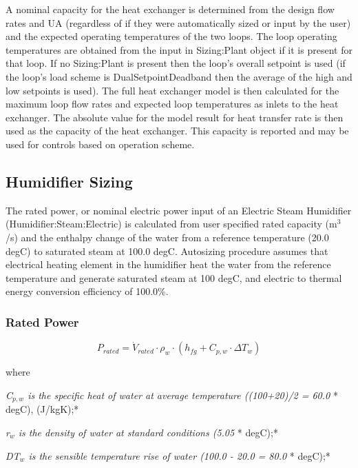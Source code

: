 A nominal capacity for the heat exchanger is determined from the design flow rates and UA (regardless of if they were automatically sized or input by the user) and the expected operating temperatures of the two loops. The loop operating temperatures are obtained from the input in Sizing:Plant object if it is present for that loop. If no Sizing:Plant is present then the loop's overall setpoint is used (if the loop's load scheme is DualSetpointDeadband then the average of the high and low setpoints is used). The full heat exchanger model is then calculated for the maximum loop flow rates and expected loop temperatures as inlets to the heat exchanger. The absolute value for the model result for heat transfer rate is then used as the capacity of the heat exchanger. This capacity is reported and may be used for controls based on operation scheme.

\subsection{Humidifier Sizing}\label{humidifier-sizing}

The rated power, or nominal electric power input of an Electric Steam Humidifier (Humidifier:Steam:Electric) is calculated from user specified rated capacity (m\(^{3}\)/s) and the enthalpy change of the water from a reference temperature (20.0 degC) to saturated steam at 100.0 degC. Autosizing procedure assumes that electrical heating element in the humidifier heat the water from the reference temperature and generate saturated steam at 100 degC, and electric to thermal energy conversion efficiency of 100.0\%.

\subsubsection{Rated Power}\label{rated-power}

\begin{equation}
{P_{rated}} = {\dot V_{rated}} \cdot {\rho_w} \cdot \left( {{h_{fg}} + {C_{p,w}} \cdot \Delta {T_w}} \right)
\end{equation}

where

\emph{C\(_{p,w}\) is the specific heat of water at average temperature ((100+20)/2 = 60.0} * degC), (J/kgK);*

\emph{r\(_{w}\) is the density of water at standard conditions (5.05} * degC);*

\emph{DT\(_{w}\) is the sensible temperature rise of water (100.0 - 20.0 = 80.0} * degC);*

